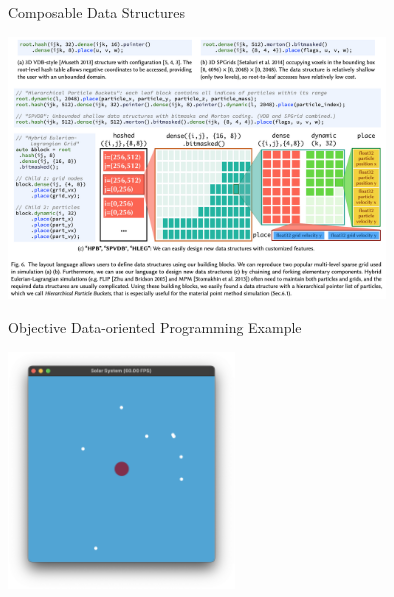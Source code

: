 \begin{frame}{Composable Data Structures}
  \begin{center}
    \includegraphics[width=10cm]{taichi_data_structures.png}
  \end{center}
\end{frame}

\begin{frame}{Objective Data-oriented Programming Example}
  \begin{center}
    \includegraphics[width=6cm]{data_oriented_example.png}
  \end{center}
\end{frame}

